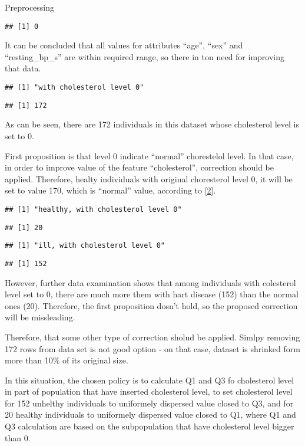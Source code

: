 \documentclass[
  ignorenonframetext,
]{beamer}
\begin{document}
\begin{frame}[fragile]{Preprocessing}
\begin{verbatim}
## [1] 0
\end{verbatim}

It can be concluded that all values for attributes ``age'', ``sex'' and
``resting\_bp\_s'' are within required range, so there in ton need for
improving that data.

\begin{verbatim}
## [1] "with cholesterol level 0"
\end{verbatim}

\begin{verbatim}
## [1] 172
\end{verbatim}

As can be seen, there are 172 individuals in this dataset whose
cholesterol level is set to 0.

First proposition is that level 0 indicate ``normal'' chorestelol level.
In that case, in order to improve value of the feature ``cholesterol'',
correction should be applied. Therefore, healty individuals with
original choresterol level 0, it will be set to value 170, which is
``normal'' value, according to {[}\protect\hyperlink{ref-medline}{2}{]}.

\begin{verbatim}
## [1] "healthy, with cholesterol level 0"
\end{verbatim}

\begin{verbatim}
## [1] 20
\end{verbatim}

\begin{verbatim}
## [1] "ill, with cholesterol level 0"
\end{verbatim}

\begin{verbatim}
## [1] 152
\end{verbatim}

However, further data examination shows that among individuals with
colesterol level set to 0, there are much more them with hart disease
(152) than the normal ones (20). Therefore, the first proposition dosn't
hold, so the proposed correction will be missleading.

Therefore, that some other type of correction sholud be applied. Simlpy
removing 172 rows from data set is not good option - on that case,
dataset is shrinked form more than 10\% of its original size.

In this situation, the chosen policy is to calculate Q1 and Q3 fo
cholesterol level in part of population that have inserted cholesterol
level, to set cholesterol level for 152 unhelthy individuals to
uniformely dispersed value closed to Q3, and for 20 healthy individuals
to uniformely dispersed value closed to Q1, where Q1 and Q3 calculation
are based on the subpopulation that have cholesterol level bigger than
0.


\end{frame}
\end{document}
